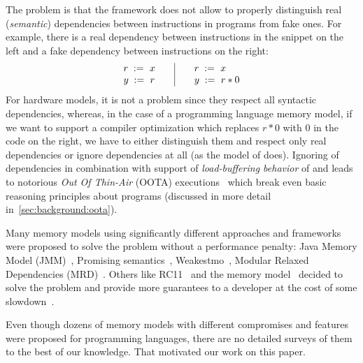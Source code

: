 The problem is that the framework does not
allow to properly distinguish real (\emph{semantic}) dependencies between instructions in programs
from fake ones. For example, there is a real dependency between instructions in the snippet on the left
and a fake dependency between instructions on the right:
\[\begin{array}{l@{\qquad}|@{\qquad}l}
\readInst{}{r}{x} & \readInst{}{r}{x} \\
\writeInst{}{y}{r} & \readInst{}{y}{r * 0} \\
\end{array}\]
For hardware models, it is not a problem since they respect all syntactic dependencies,
whereas, in the case of a programming language memory model,
if we want to support a compiler optimization which replaces $r * 0$ with $0$ in the code on the right,
we have to either distinguish them and respect only real dependencies
or ignore dependencies at all (as the model of \CPP does).
Ignoring of dependencies in combination with support of \emph{load-buffering behavior} of \ARM and \POWER
leads to notorious \emph{Out Of Thin-Air} (OOTA) executions~\cite{Boehm-Demsky:MSPC14}
which break even basic reasoning principles about programs
(discussed in more detail in~\cref{sec:background:oota}).

Many memory models using significantly different approaches and frameworks were proposed to solve the problem
without a performance penalty:
Java Memory Model (JMM)~\cite{Manson-al:POPL05}, Promising semantics~\cite{Kang-al:POPL17,Lee-al:PLDI20},
Weakestmo~\cite{Chakraborty-Vafeiadis:POPL19}, Modular Relaxed Dependencies (MRD)~\cite{Paviotti-al:ESOP20}.
Others like RC11~\cite{Lahav-al:PLDI17} and the \OCaml memory model~\cite{Dolan-al:PLDI18} decided to solve
the problem and provide more guarantees to a developer at the cost of some slowdown~\cite{Ou-Demsky:OOPSLA18}.

Even though dozens of memory models with different compromises and features were proposed for programming languages,
there are no detailed surveys of them to the best of our knowledge. That motivated our work on this paper.



